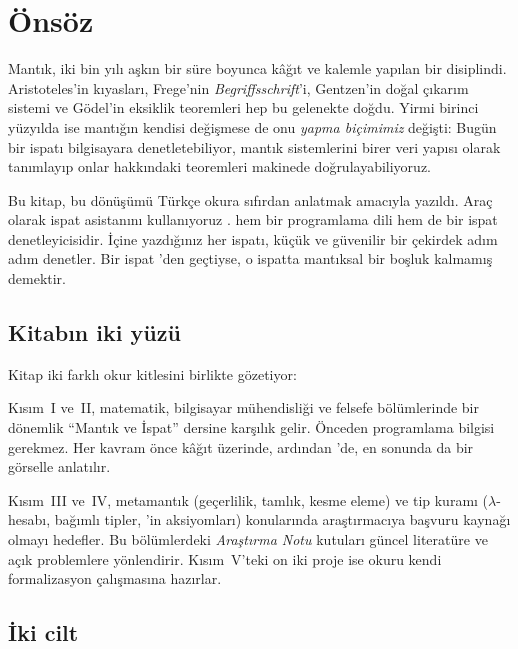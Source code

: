 \chapter*{Önsöz}

Mantık, iki bin yılı aşkın bir süre boyunca kâğıt ve kalemle yapılan bir
disiplindi. Aristoteles'in kıyasları, Frege'nin \emph{Begriffsschrift}'i,
Gentzen'in doğal çıkarım sistemi ve Gödel'in eksiklik teoremleri hep bu
gelenekte doğdu. Yirmi birinci yüzyılda ise mantığın kendisi değişmese de onu
\emph{yapma biçimimiz} değişti: Bugün bir ispatı bilgisayara denetletebiliyor,
mantık sistemlerini birer veri yapısı olarak tanımlayıp onlar hakkındaki
teoremleri makinede doğrulayabiliyoruz.

Bu kitap, bu dönüşümü Türkçe okura sıfırdan anlatmak amacıyla yazıldı. Araç
olarak \Lean{} ispat asistanını kullanıyoruz \citep{demoura2021lean4}. \Lean{}
hem bir programlama dili hem de bir ispat denetleyicisidir. İçine yazdığınız
her ispatı, küçük ve güvenilir bir çekirdek adım adım denetler. Bir ispat
\Lean{}'den geçtiyse, o ispatta mantıksal bir boşluk kalmamış demektir.

\section*{Kitabın iki yüzü}

Kitap iki farklı okur kitlesini birlikte gözetiyor:

\begin{description}[font=\baslikfont\bfseries\color{anarenk}]
  \item[Ders kitabı olarak] Kısım~I ve~II, matematik, bilgisayar mühendisliği
  ve felsefe bölümlerinde bir dönemlik ``Mantık ve İspat'' dersine karşılık
  gelir. Önceden programlama bilgisi gerekmez. Her kavram önce kâğıt üzerinde,
  ardından \Lean{}'de, en sonunda da bir görselle anlatılır.
  \item[El kitabı olarak] Kısım~III ve~IV, metamantık (geçerlilik, tamlık,
  kesme eleme) ve tip kuramı ($\lambda$-hesabı, bağımlı tipler, \Lean{}'in
  aksiyomları) konularında araştırmacıya başvuru kaynağı olmayı hedefler.
  Bu bölümlerdeki \emph{Araştırma Notu} kutuları güncel literatüre ve açık
  problemlere yönlendirir. Kısım~V'teki on iki proje ise okuru kendi
  formalizasyon çalışmasına hazırlar.
\end{description}

\section*{İki cilt}

